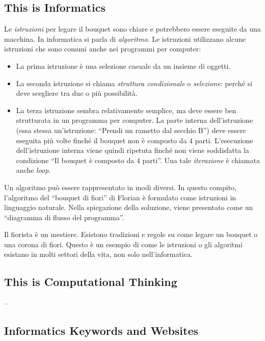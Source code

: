 \documentclass[a4paper,11pt]{report}
\begin{document}
\subsection*{This is Informatics}

Le \emph{istruzioni} per legare il bouquet sono chiare e potrebbero essere eseguite da una macchina. In informatica si parla di \emph{algoritmo}. Le istruzioni utilizzano alcune istruzioni che sono comuni anche nei programmi per computer:

\begin{itemize}
  \item La prima istruzione è una selezione casuale da un insieme di oggetti.
  \item La seconda istruzione si chiama \emph{struttura condizionale} o \emph{selezione}: perché si deve scegliere tra due o più possibilità.
  \item La terza istruzione sembra relativamente semplice, ma deve essere ben strutturata in un programma per computer. La parte interna dell’istruzione (essa stessa un’istruzione: \enquote{Prendi un rametto dal secchio B}) deve essere eseguita più volte finché il bouquet non è composto da $4$ parti. L’esecuzione dell’istruzione interna viene quindi ripetuta finché non viene soddisfatta la condizione \enquote{Il bouquet è composto da $4$ parti}. Una tale \emph{iterazione} è chiamata anche \emph{loop}.
\end{itemize}

Un algoritmo può essere rappresentato in modi diversi.  In questo compito, l’algoritmo del \enquote{bouquet di fiori} di Florian è formulato come istruzioni in linguaggio naturale. Nella spiegazione della soluzione, viene presentato come un \enquote{diagramma di flusso del programma}.

Il fiorista è un mestiere. Esistono tradizioni e regole su come legare un bouquet o una corona di fiori. Questo è un esempio di come le istruzioni o gli algoritmi esistano in molti settori della vita, non solo nell’informatica.


\subsection*{This is Computational Thinking}

–


\subsection*{Informatics Keywords and Websites}
\end{document}
